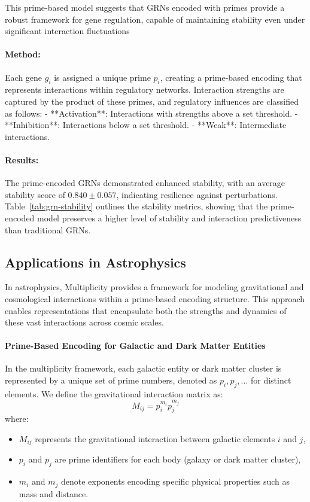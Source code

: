 \documentclass{article}
\theoremstyle{plain}
\begin{document}
This prime-based model suggests that GRNs encoded with primes provide a robust framework for gene regulation, capable of maintaining stability even under significant interaction fluctuations

\paragraph{Method:} Each gene \( g_i \) is assigned a unique prime \( p_i \), creating a prime-based encoding that represents interactions within regulatory networks. Interaction strengths are captured by the product of these primes, and regulatory influences are classified as follows:
- **Activation**: Interactions with strengths above a set threshold.
- **Inhibition**: Interactions below a set threshold.
- **Weak**: Intermediate interactions.

\paragraph{Results:} The prime-encoded GRNs demonstrated enhanced stability, with an average stability score of \(0.840 \pm 0.057\), indicating resilience against perturbations. Table~\ref{tab:grn-stability} outlines the stability metrics, showing that the prime-encoded model preserves a higher level of stability and interaction predictiveness than traditional GRNs.

\subsection{Applications in Astrophysics}

In astrophysics, Multiplicity provides a framework for modeling gravitational and cosmological interactions within a prime-based encoding structure. This approach enables representations that encapsulate both the strengths and dynamics of these vast interactions across cosmic scales.

\paragraph{Prime-Based Encoding for Galactic and Dark Matter Entities}

In the multiplicity framework, each galactic entity or dark matter cluster is represented by a unique set of prime numbers, denoted as \( p_i, p_j, \dots \) for distinct elements. We define the gravitational interaction matrix as:
\begin{equation}
M_{ij} = p_i^{m_i} p_j^{m_j}
\end{equation}
where:
\begin{itemize}
    \item \( M_{ij} \) represents the gravitational interaction between galactic elements \( i \) and \( j \),
    \item \( p_i \) and \( p_j \) are prime identifiers for each body (galaxy or dark matter cluster),
    \item \( m_i \) and \( m_j \) denote exponents encoding specific physical properties such as mass and distance.
\end{itemize}
\end{document}
